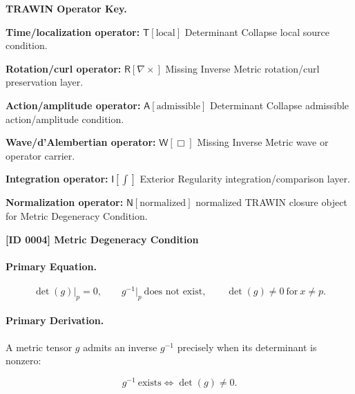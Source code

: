 \par\vspace{0.45\baselineskip}
\noindent\begin{minipage}[t]{\linewidth}
\begingroup
\small
\raggedright
\textbf{TRAWIN Operator Key.}\par
\noindent\textbf{Time/localization operator:} $\mathsf{T}\!\left[\mathrm{local}\right]$ Determinant Collapse local source condition.\par
\noindent\textbf{Rotation/curl operator:} $\mathsf{R}\!\left[\nabla\times\right]$ Missing Inverse Metric rotation/curl preservation layer.\par
\noindent\textbf{Action/amplitude operator:} $\mathsf{A}\!\left[\mathrm{admissible}\right]$ Determinant Collapse admissible action/amplitude condition.\par
\noindent\textbf{Wave/d'Alembertian operator:} $\mathsf{W}\!\left[\Box\right]$ Missing Inverse Metric wave or operator carrier.\par
\noindent\textbf{Integration operator:} $\mathsf{I}\!\left[\int\right]$ Exterior Regularity integration/comparison layer.\par
\noindent\textbf{Normalization operator:} $\mathsf{N}\!\left[\mathrm{normalized}\right]$ normalized TRAWIN closure object for Metric Degeneracy Condition.\par
\endgroup
\end{minipage}

\clearpage
\noindent\textbf{[ID 0004] Metric Degeneracy Condition}\par
\vspace{0.35em}
\paragraph{Primary Equation.}
\begin{equation}
\det(g)\big|_{p}=0,
\qquad
g^{-1}\big|_{p}\ \text{does not exist},
\qquad
\det(g)\neq 0\ \text{for}\ x\neq p .
\end{equation}

\paragraph{Primary Derivation.}
A metric tensor $g$ admits an inverse $g^{-1}$ precisely when its determinant is nonzero:

\begin{equation}
g^{-1}\ \text{exists}
\iff
\det(g)\neq 0 .
\end{equation}

